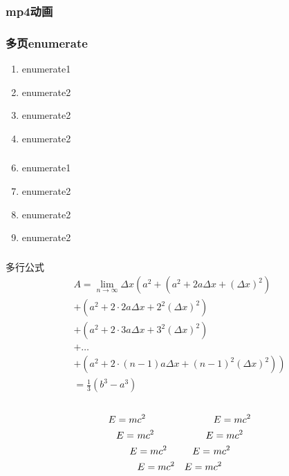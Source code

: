 \begin{frame}
  \frametitle{mp4动画}
\begin{center}
\end{center}
\end{frame}


\begin{frame}
 \frametitle{多页enumerate}    
    \begin{enumerate}
      \item enumerate1
      \item enumerate2
      \item enumerate2 
      \item enumerate2
    \end{enumerate}
\end{frame}

\begin{frame}
  \frametitle{}    
     \begin{enumerate}
      \setcounter{enumi}{5}
       \item enumerate1
       \item enumerate2
       \item enumerate2 
       \item enumerate2
     \end{enumerate}
 \end{frame}


\begin{frame}
    \frametitle{}
    多行公式
    \begin{multline}
            A=\lim_{n\rightarrow\infty}\Delta x\left(a^{2}+\left(a^{2}+2a\Delta x+\left(\Delta x\right)^{2}\right)\right.\label{eq:reset}\\
            +\left(a^{2}+2\cdot2a\Delta x+2^{2}\left(\Delta x\right)^{2}\right)\\
            +\left(a^{2}+2\cdot3a\Delta x+3^{2}\left(\Delta x\right)^{2}\right)\\
            +\ldots\\
            \left.+\left(a^{2}+2\cdot(n-1)a\Delta x+(n-1)^{2}\left(\Delta x\right)^{2}\right)\right)\\
            =\frac{1}{3}\left(b^{3}-a^{3}\right)
    \end{multline}\\
    \begin{align}
      E=m&c^2 & &E=mc^2\\
      E=~&mc^2 & E&=mc^2 \notag \\
      E&=mc^2 & E=~&mc^2\\
      &E=mc^2 & E=m&c^2
\end{align}
\end{frame}

